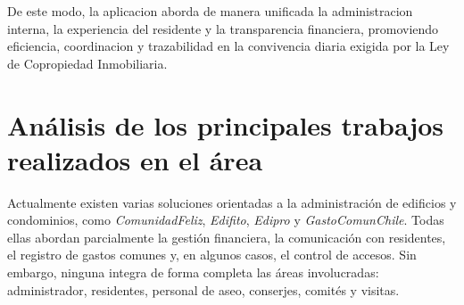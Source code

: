 De este modo, la aplicacion aborda de manera unificada la administracion interna, la experiencia del residente y la transparencia financiera, promoviendo eficiencia, coordinacion y trazabilidad en la convivencia diaria exigida por la Ley de Copropiedad Inmobiliaria.

\section{Análisis de los principales trabajos realizados en el área}

Actualmente existen varias soluciones orientadas a la administración de edificios y condominios, como \textit{ComunidadFeliz}, \textit{Edifito}, \textit{Edipro} y \textit{GastoComunChile}. Todas ellas abordan parcialmente la gestión financiera, la comunicación con residentes, el registro de gastos comunes y, en algunos casos, el control de accesos. Sin embargo, ninguna integra de forma completa las áreas involucradas: administrador, residentes, personal de aseo, conserjes, comités y visitas.

